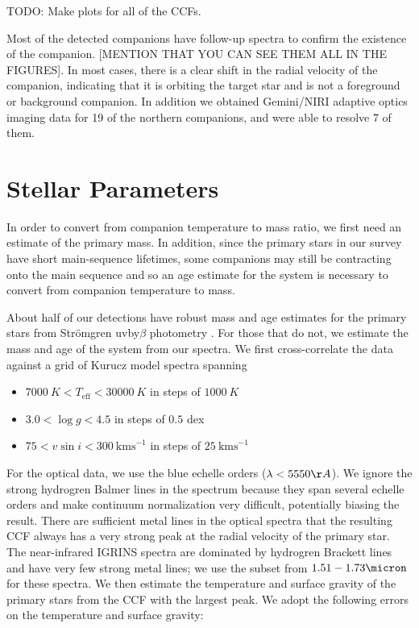 \documentclass{emulateapj}
\begin{document}
TODO: Make plots for all of the CCFs.

Most of the detected companions have follow-up spectra to confirm the existence of the companion. [MENTION THAT YOU CAN SEE THEM ALL IN THE FIGURES]. In most cases, there is a clear shift in the radial velocity of the companion, indicating that it is orbiting the target star and is not a foreground or background companion. In addition we obtained Gemini/NIRI adaptive optics imaging data for 19 of the northern companions, and were able to resolve 7 of them. 




\section{Stellar Parameters}
\label{sec:sp}

In order to convert from companion temperature to mass ratio, we first need an estimate of the primary mass. In addition, since the primary stars in our survey have short main-sequence lifetimes, some companions may still be contracting onto the main sequence and so an age estimate for the system is necessary to convert from companion temperature to mass.

About half of our detections have robust mass and age estimates for the primary stars from Str\"omgren uvby$\beta$ photometry \citep{David2015}. For those that do not, we estimate the mass and age of the system from our spectra. We first cross-correlate the data against a grid of Kurucz model spectra \citep{Castelli2003} spanning

\begin{itemize}
\item $7000\ K < T_\mathrm{eff} < 30000\ K$ in steps of $1000\ K$
\item $3.0 < \log{g} < 4.5$ in steps of $0.5$ dex
\item $75 < v\sin{i} < 300\ \mathrm{km s}^{-1}$ in steps of $25\ \mathrm{km s}^{-1}$
\end{itemize}
For the optical data, we use the blue echelle orders ($\lambda < 5550 \AA$). We ignore the strong hydrogren Balmer lines in the spectrum because they span several echelle orders and make continuum normalization very difficult, potentially biasing the result. There are sufficient metal lines in the optical spectra that the resulting CCF always has a very strong peak at the radial velocity of the primary star. The near-infrared IGRINS spectra are dominated by hydrogren Brackett lines and have very few strong metal lines; we use the subset from $1.51 - 1.73 \micron$ for these spectra. We then estimate the temperature and surface gravity of the primary stars from the CCF with the largest peak. We adopt the following errors on the temperature and surface gravity:
\end{document}

